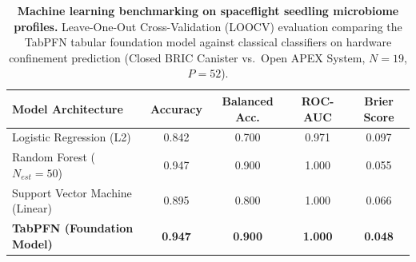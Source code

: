 \begin{table}[t]
\centering
\small
\caption{\textbf{Machine learning benchmarking on spaceflight seedling microbiome profiles.} Leave-One-Out Cross-Validation (LOOCV) evaluation comparing the TabPFN tabular foundation model \citep{hollmann2025accurate} against classical classifiers on hardware confinement prediction (Closed BRIC Canister vs.\ Open APEX System, $N=19$, $P=52$).}
\label{tab:benchmarks}
\begin{tabularx}{\columnwidth}{@{}l c c c c@{}}
\toprule
\textbf{Model Architecture} & \textbf{Accuracy} & \textbf{Balanced Acc.} & \textbf{ROC-AUC} & \textbf{Brier Score} \\
\midrule
Logistic Regression (L2) & 0.842 & 0.700 & 0.971 & 0.097 \\
Random Forest ($N_{est}=50$) & 0.947 & 0.900 & 1.000 & 0.055 \\
Support Vector Machine (Linear) & 0.895 & 0.800 & 1.000 & 0.066 \\
\textbf{TabPFN (Foundation Model)} & \textbf{0.947} & \textbf{0.900} & \textbf{1.000} & \textbf{0.048} \\
\bottomrule
\end{tabularx}
\end{table}
